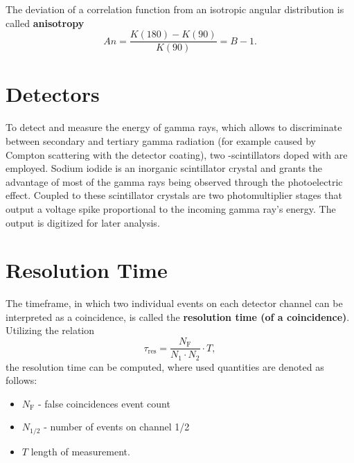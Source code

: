 The deviation of a correlation function from an isotropic angular distribution is called \textbf{anisotropy}
\begin{equation}\label{eq:aniso}
	An=\frac{K(180)-K(90)}{K(90)}=B-1.
\end{equation}

\section{Detectors}\label{sec:detectors}
To detect and measure the energy of gamma rays, which allows to discriminate between secondary and tertiary gamma radiation (for example caused by Compton scattering with the detector coating), two -scintillators doped with  are employed.
Sodium iodide is an inorganic scintillator crystal and grants the advantage of most of the gamma rays being observed through the photoelectric effect.
Coupled to these scintillator crystals are two photomultiplier stages that output a voltage spike proportional to the incoming gamma ray's energy.
The output is digitized for later analysis.

\section{Resolution Time}
The timeframe, in which two individual events on each detector channel can be interpreted as a coincidence, is called the \textbf{resolution time (of a coincidence)}.
Utilizing the relation
\begin{equation}\label{eq:res_time}
	\tau_\text{res}=\frac{N_\text{F}}{N_1\cdot N_2}\cdot T,
\end{equation}
the resolution time can be computed, where used quantities are denoted as follows:
\begin{itemize}
	\item $N_\text{F}$ - false coincidences event count
	\item $N_{1/2}$ - number of events on channel 1/2
	\item $T$ length of measurement.
\end{itemize}
